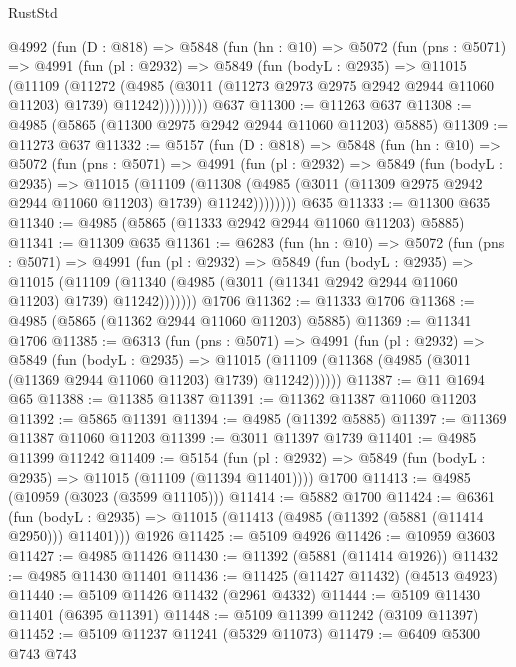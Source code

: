\begin{lexlean}{RustStd}
\begin{coremodule}
    @4992
      (fun (D : @818) =>
      @5848
        (fun (hn : @10) =>
        @5072
          (fun (pns : @5071) =>
          @4991
            (fun (pl : @2932) =>
            @5849
              (fun (bodyL : @2935) =>
              @11015
                (@11109
                  (@11272
                    (@4985
                      (@3011 (@11273 @2973 @2975 @2942 @2944 @11060 @11203) @1739)
                      @11242)))))))))
    @637
@11300 := @11263 @637
@11308 := @4985 (@5865 (@11300 @2975 @2942 @2944 @11060 @11203) @5885)
@11309 := @11273 @637
@11332 := @5157
    (fun (D : @818) =>
    @5848
      (fun (hn : @10) =>
      @5072
        (fun (pns : @5071) =>
        @4991
          (fun (pl : @2932) =>
          @5849
            (fun (bodyL : @2935) =>
            @11015
              (@11109
                (@11308 (@4985 (@3011 (@11309 @2975 @2942 @2944 @11060 @11203) @1739) @11242))))))))
    @635
@11333 := @11300 @635
@11340 := @4985 (@5865 (@11333 @2942 @2944 @11060 @11203) @5885)
@11341 := @11309 @635
@11361 := @6283
    (fun (hn : @10) =>
    @5072
      (fun (pns : @5071) =>
      @4991
        (fun (pl : @2932) =>
        @5849
          (fun (bodyL : @2935) =>
          @11015
            (@11109 (@11340 (@4985 (@3011 (@11341 @2942 @2944 @11060 @11203) @1739) @11242)))))))
    @1706
@11362 := @11333 @1706
@11368 := @4985 (@5865 (@11362 @2944 @11060 @11203) @5885)
@11369 := @11341 @1706
@11385 := @6313
    (fun (pns : @5071) =>
    @4991
      (fun (pl : @2932) =>
      @5849
        (fun (bodyL : @2935) =>
        @11015 (@11109 (@11368 (@4985 (@3011 (@11369 @2944 @11060 @11203) @1739) @11242))))))
@11387 := @11 @1694 @65
@11388 := @11385 @11387
@11391 := @11362 @11387 @11060 @11203
@11392 := @5865 @11391
@11394 := @4985 (@11392 @5885)
@11397 := @11369 @11387 @11060 @11203
@11399 := @3011 @11397 @1739
@11401 := @4985 @11399 @11242
@11409 := @5154
    (fun (pl : @2932) => @5849 (fun (bodyL : @2935) => @11015 (@11109 (@11394 @11401))))
    @1700
@11413 := @4985 (@10959 (@3023 (@3599 @11105)))
@11414 := @5882 @1700
@11424 := @6361
    (fun (bodyL : @2935) => @11015 (@11413 (@4985 (@11392 (@5881 (@11414 @2950))) @11401)))
    @1926
@11425 := @5109 @4926
@11426 := @10959 @3603
@11427 := @4985 @11426
@11430 := @11392 (@5881 (@11414 @1926))
@11432 := @4985 @11430 @11401
@11436 := @11425 (@11427 @11432) (@4513 @4923)
@11440 := @5109 @11426 @11432 (@2961 @4332)
@11444 := @5109 @11430 @11401 (@6395 @11391)
@11448 := @5109 @11399 @11242 (@3109 @11397)
@11452 := @5109 @11237 @11241 (@5329 @11073)
@11479 := @6409
    @5300
    @743
    @743

\end{coremodule}
\end{lexlean}

